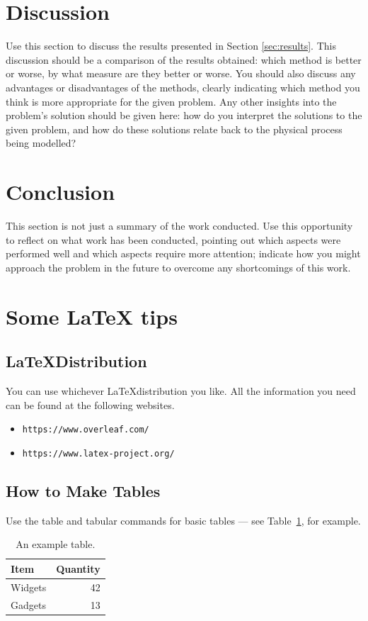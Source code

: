 \documentclass[a4paper]{article}
\begin{document}
	
	
	
	
\section{Discussion}\label{sec:discussion}
	Use this section to discuss the results presented in Section \ref{sec:results}. This discussion should be a comparison of the results obtained: which method is better or worse, by what measure are they better or worse. You should also discuss any advantages or disadvantages of the methods, clearly indicating which method you think is more appropriate for the given problem. Any other insights into the problem's solution should be given here: how do you interpret the solutions to the given problem, and how do these solutions relate back to the physical process being modelled? 

\section{Conclusion}\label{sec:conclusion}
	This section is not just a summary of the work conducted. Use this opportunity to reflect on what work has been conducted, pointing out which aspects were performed well and which aspects require more attention; indicate how you might approach the problem in the future to overcome any shortcomings of this work.
\newpage
\section{Some LaTeX tips}
\label{sec:latex}
\subsection{\LaTeX Distribution}
You can use whichever \LaTeX distribution you like. All the information you need can be found at the following websites.\\
\begin{itemize}
	\item {\tt https://www.overleaf.com/}
	\item {\tt https://www.latex-project.org/}	
\end{itemize}

\subsection{How to Make Tables}
Use the table and tabular commands for basic tables --- see Table~\ref{tab:widgets}, for example.
\begin{table}[h]
\centering
\begin{tabular}{|l|r|}
	\hline
	Item & Quantity \\\hline
	Widgets & 42 \\
	Gadgets & 13 \\
	\hline
\end{tabular}
\caption{\label{tab:widgets}An example table.}
\end{table}
\end{document}
